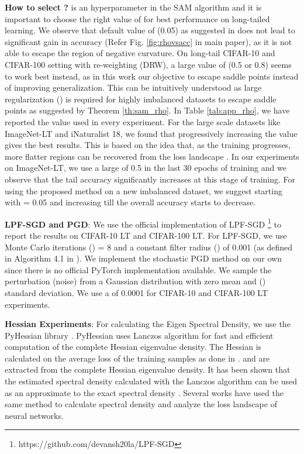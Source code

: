 \documentclass{article}
\begin{document}
\vspace{1mm}\noindent \textbf{How to select \textbf{} ?}  is an hyperparameter in the SAM algorithm and it is important to choose the right value of  for best performance on long-tailed learning. We observe that default value of  (0.05) as suggested in \citet{foret2021sharpnessaware} does not lead to significant gain in accuracy (Refer Fig. \ref{fig:rhovsacc} in main paper), as it is not able to escape the region of negative curvature. On long-tail CIFAR-10 and CIFAR-100 setting with re-weighting (DRW), a large value of  (0.5 or 0.8) seems to work best instead, as in this work our objective to escape saddle points instead of improving generalization. This can be intuitively understood as large regularization () is required for highly imbalanced datasets to escape saddle points as suggested by Theorem \ref{th:sam_rho}. In Table \ref{tab:app_rho}, we have reported the  value used in every experiment. For the large scale datasets like ImageNet-LT and iNaturalist 18, we found that progressively increasing the  value gives the best results. This is based on the idea that, as the training progresses, more flatter regions can be recovered from the loss landscape \cite{bisla2022low}. In our experiments on ImageNet-LT, we use a large  of 0.5 in the last 30 epochs of training and we observe that the tail accuracy significantly increases at this stage of training. For using the proposed method on a new imbalanced dataset, we suggest starting with  = 0.05 and increasing  till the overall accuracy starts to decrease.

\vspace{1mm}\noindent \textbf{LPF-SGD and PGD}:
We use the official implementation of LPF-SGD \cite{bisla2022low} \footnote{https://github.com/devansh20la/LPF-SGD} to report the results on CIFAR-10 LT and CIFAR-100 LT. For LPF-SGD, we use Monte Carlo iterations () = 8 and a constant filter radius () of 0.001 (as defined in Algorithm 4.1 in \citet{bisla2022low}). We implement the stochastic PGD method \cite{jin2017escape, Jin2019StochasticGD} on our own since there is no official PyTorch implementation available. We sample the perturbation (noise) from a Gaussian distribution with zero mean and () standard deviation. We use a  of 0.0001 for CIFAR-10 and CIFAR-100 LT experiments.

\vspace{1mm}\noindent \textbf{Hessian Experiments}: For calculating the Eigen Spectral Density, we use the PyHessian library \cite{yao2020pyhessian}. PyHessian uses Lanczos algorithm for fast and efficient computation of the complete Hessian eigenvalue density. The Hessian is calculated on the average loss of the training samples as done in \cite{pmlr-v97-ghorbani19b, yao2020pyhessian}.  and  are extracted from the complete Hessian eigenvalue density. It has been shown that the estimated spectral density calculated with the Lanczos algorithm can be used as an approximate to the exact spectral density \cite{pmlr-v97-ghorbani19b}. Several works \cite{foret2021sharpnessaware, pmlr-v97-ghorbani19b, gilmer2021loss, yao2020pyhessian} have used the same method to calculate spectral density and analyze the loss landscape of neural networks. 
\end{document}
